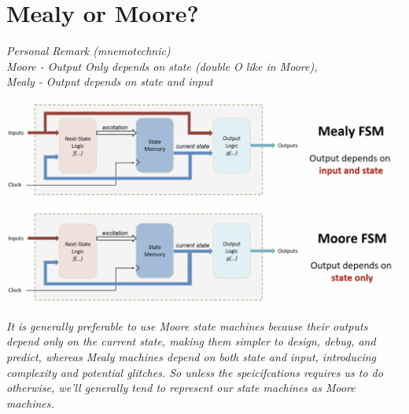 \section{Mealy or Moore?}
\textit{Personal Remark (mnemotechnic)} \\
\textit{Moore - Output Only depends on state (double O like in Moore),}\\
\textit{Mealy - Output depends on state and input}\\
\begin{center}
    \includegraphics[width=1\textwidth]{chapters/chapter2a/images/moore_mealy.png}
\end{center}
\textit{It is generally preferable to use Moore state machines because their outputs depend only on the current state, making them simpler to design, debug, and predict, whereas Mealy machines depend on both state and input, introducing complexity and potential glitches. So unless the speicifcations requires us to do otherwise, we'll generally tend to represent our state machines as Moore machines.} \\
